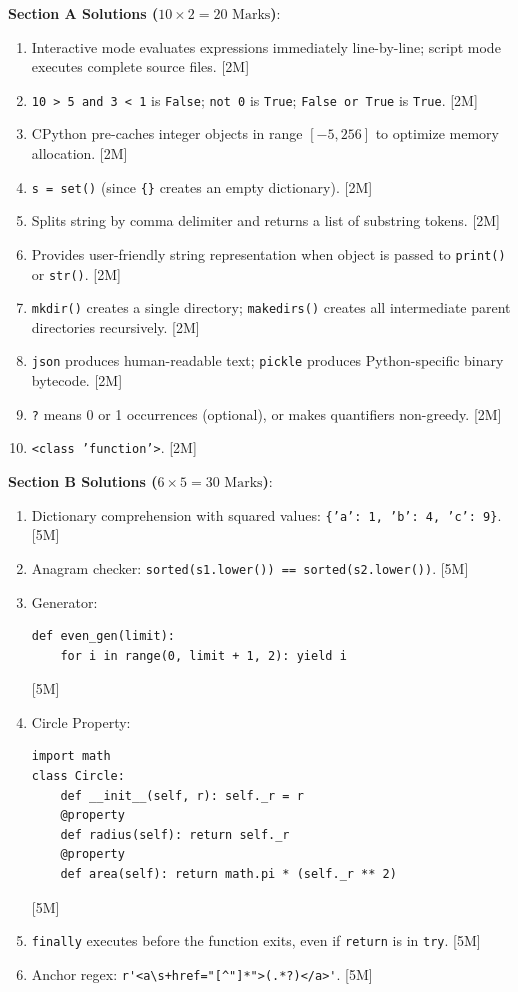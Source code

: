 \begin{solutionbox}
\noindent\textbf{Section A Solutions ($10 \times 2 = 20\text{ Marks}$)}:
\begin{enumerate}
    \item Interactive mode evaluates expressions immediately line-by-line; script mode executes complete source files. [2M]
    \item \texttt{10 > 5 and 3 < 1} is \texttt{False}; \texttt{not 0} is \texttt{True}; \texttt{False or True} is \texttt{True}. [2M]
    \item CPython pre-caches integer objects in range $[-5, 256]$ to optimize memory allocation. [2M]
    \item \texttt{s = set()} (since \texttt{\{\}} creates an empty dictionary). [2M]
    \item Splits string by comma delimiter and returns a list of substring tokens. [2M]
    \item Provides user-friendly string representation when object is passed to \texttt{print()} or \texttt{str()}. [2M]
    \item \texttt{mkdir()} creates a single directory; \texttt{makedirs()} creates all intermediate parent directories recursively. [2M]
    \item \texttt{json} produces human-readable text; \texttt{pickle} produces Python-specific binary bytecode. [2M]
    \item \texttt{?} means 0 or 1 occurrences (optional), or makes quantifiers non-greedy. [2M]
    \item \texttt{<class 'function'>}. [2M]
\end{enumerate}

\medskip
\noindent\textbf{Section B Solutions ($6 \times 5 = 30\text{ Marks}$)}:
\begin{enumerate}[start=11]
    \item Dictionary comprehension with squared values: \texttt{\{'a': 1, 'b': 4, 'c': 9\}}. [5M]
    \item Anagram checker: \texttt{sorted(s1.lower()) == sorted(s2.lower())}. [5M]
    \item Generator:
    \begin{lstlisting}[language=Python3]
def even_gen(limit):
    for i in range(0, limit + 1, 2): yield i
    \end{lstlisting} [5M]
    \item Circle Property:
    \begin{lstlisting}[language=Python3]
import math
class Circle:
    def __init__(self, r): self._r = r
    @property
    def radius(self): return self._r
    @property
    def area(self): return math.pi * (self._r ** 2)
    \end{lstlisting} [5M]
    \item \texttt{finally} executes before the function exits, even if \texttt{return} is in \texttt{try}. [5M]
    \item Anchor regex: \lstinline|r'<a\s+href="[^"]*">(.*?)</a>'|. [5M]
\end{enumerate}


\end{solutionbox}
